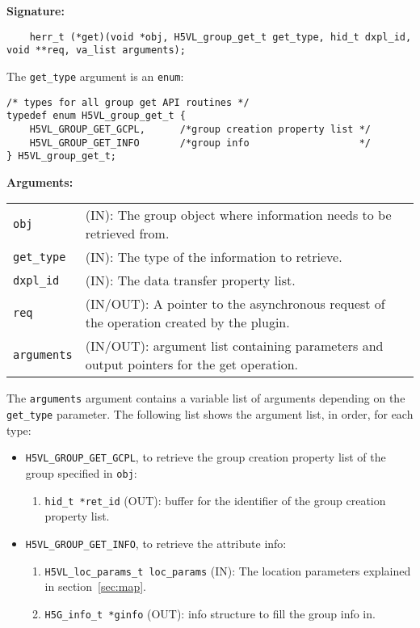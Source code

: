 \begin{mdframed}[style=bgbox]
\textbf{Signature:}
\begin{lstlisting}
    herr_t (*get)(void *obj, H5VL_group_get_t get_type, hid_t dxpl_id, void **req, va_list arguments);
\end{lstlisting}

The \texttt{get\_type} argument is an \texttt{enum}:
\begin{lstlisting}
/* types for all group get API routines */
typedef enum H5VL_group_get_t {
    H5VL_GROUP_GET_GCPL,      /*group creation property list */
    H5VL_GROUP_GET_INFO       /*group info                   */
} H5VL_group_get_t;
\end{lstlisting}

\textbf{Arguments:}\\
\begin{tabular}{l p{10cm}}
  \texttt{obj} & (IN): The group object where information needs to be
  retrieved from.\\
  \texttt{get\_type} & (IN): The type of the information to retrieve.\\
  \texttt{dxpl\_id} & (IN): The data transfer property list.\\
  \texttt{req} & (IN/OUT): A pointer to the asynchronous request of the
  operation created by the plugin.\\
  \texttt{arguments} & (IN/OUT): argument list containing parameters and
  output pointers for the get operation. \\
\end{tabular}
\end{mdframed}

The \texttt{arguments} argument contains a variable list of arguments
depending on the \texttt{get\_type} parameter. The following list shows
the argument list, in order, for each type:

\begin{itemize}
\item \texttt{H5VL\_GROUP\_GET\_GCPL}, to retrieve the group creation
  property list of the group specified in \texttt{obj}:
  \begin{enumerate}
  \item \texttt{hid\_t *ret\_id} (OUT): buffer for the identifier of the
    group creation property list.
  \end{enumerate}

\item \texttt{H5VL\_GROUP\_GET\_INFO}, to retrieve the attribute info:
  \begin{enumerate}
  \item \texttt{H5VL\_loc\_params\_t loc\_params} (IN): The location parameters
    explained in section~\ref{sec:map}. 
  \item \texttt{H5G\_info\_t *ginfo} (OUT): info structure to fill the
    group info in.
  \end{enumerate}
\end{itemize}

